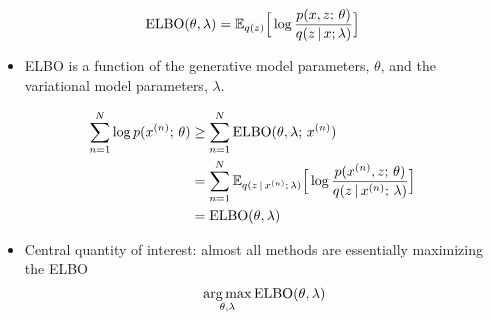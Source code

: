 
\begin{frame}
    \[ \operatorname*{ELBO}(\theta, \lambda) = \mathbb{E}_{q(z)}\Big[\log \frac{p(x, z ; \, \theta)}{q(z\,|\, x;\lambda)} \Big]\]
\begin{itemize}
    \item ELBO is a function of the generative model parameters, $\theta$, and the variational model parameters, $\lambda$.
\end{itemize}
\begin{align*}
    \sum_{n=1}^N \log p(x^{(n)} ; \, \theta) &\ge \sum_{n=1}^N \operatorname*{ELBO}(\theta, \lambda ; \, x^{(n)}) \\
    &= \sum_{n=1}^N \mathbb{E}_{q(z \,|\, x^{(n)} ; \, \lambda)}\Big[\log \frac{p(x^{(n)}, z ; \, \theta)}{q(z \,|\, x^{(n)} ; \, \lambda)} \Big] \\
    &= \operatorname*{ELBO}(\theta, \lambda)
\end{align*} 
\end{frame}

\begin{frame}

\begin{itemize}
    \item Central quantity of interest: almost all methods are essentially maximizing the ELBO
    \[ \argmax_{\theta, \lambda} \ELBO(\theta, \lambda)\] 
\end{itemize}
\end{frame}

